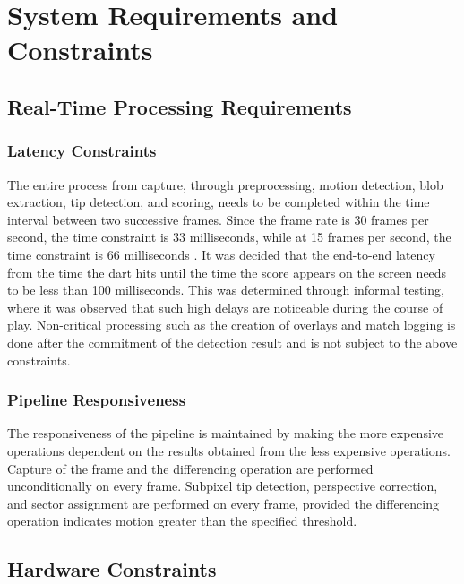 \setauthor{\secondauthor}

\section{System Requirements and Constraints}

\subsection{Real-Time Processing Requirements}

\subsubsection{Latency Constraints}
The entire process from capture, through preprocessing, motion detection, blob extraction, tip detection, and scoring, needs to be completed within the time interval between two successive frames. Since the frame rate is 30 frames per second, the time constraint is 33 milliseconds, while at 15 frames per second, the time constraint is 66 milliseconds \cite{Szeliski2022}. It was decided that the end-to-end latency from the time the dart hits until the time the score appears on the screen needs to be less than 100 milliseconds. This was determined through informal testing, where it was observed that such high delays are noticeable during the course of play. Non-critical processing such as the creation of overlays and match logging is done after the commitment of the detection result and is not subject to the above constraints.

\subsubsection{Pipeline Responsiveness}
The responsiveness of the pipeline is maintained by making the more expensive operations dependent on the results obtained from the less expensive operations. Capture of the frame and the differencing operation are performed unconditionally on every frame. Subpixel tip detection, perspective correction, and sector assignment are performed on every frame, provided the differencing operation indicates motion greater than the specified threshold.


\subsection{Hardware Constraints}

